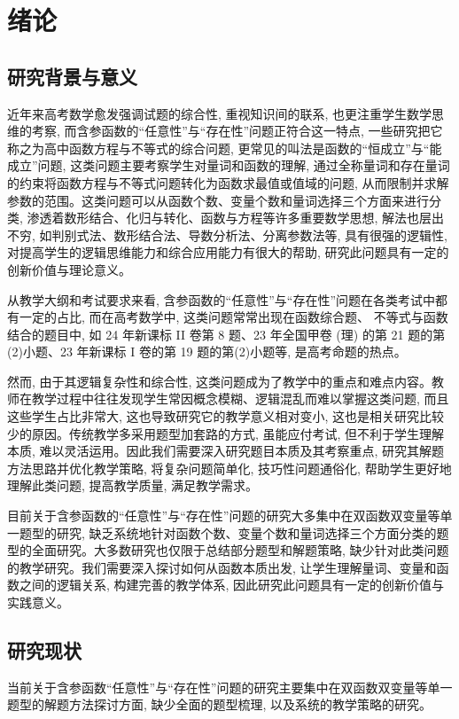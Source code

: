 
\chapter{绪论}
\section{研究背景与意义}
近年来高考数学愈发强调试题的综合性, 重视知识间的联系, 也更注重学生数学思维的考察, 而含参函数的“任意性”与“存在性”问题正符合这一特点, 一些研究把它称之为高中函数方程与不等式的综合问题, 更常见的叫法是函数的“恒成立”与“能成立”问题, 这类问题主要考察学生对量词和函数的理解, 通过全称量词和存在量词的约束将函数方程与不等式问题转化为函数求最值或值域的问题, 从而限制并求解参数的范围。这类问题可以从函数个数、变量个数和量词选择三个方面来进行分类, 渗透着数形结合、化归与转化、函数与方程等许多重要数学思想, 解法也层出不穷, 如判别式法、数形结合法、导数分析法、分离参数法等, 具有很强的逻辑性, 对提高学生的逻辑思维能力和综合应用能力有很大的帮助, 研究此问题具有一定的创新价值与理论意义。

从教学大纲和考试要求来看, 含参函数的“任意性”与“存在性”问题在各类考试中都有一定的占比, 而在高考数学中, 这类问题常常出现在函数综合题、 不等式与函数结合的题目中, 如 24 年新课标 II 卷第 8 题、23 年全国甲卷 (理) 的第 21 题的第(2)小题、23 年新课标 I 卷的第 19 题的第(2)小题等, 是高考命题的热点。

然而, 由于其逻辑复杂性和综合性, 这类问题成为了教学中的重点和难点内容。教师在教学过程中往往发现学生常因概念模糊、逻辑混乱而难以掌握这类问题, 而且这些学生占比非常大, 这也导致研究它的教学意义相对变小, 这也是相关研究比较少的原因。传统教学多采用题型加套路的方式, 虽能应付考试, 但不利于学生理解本质, 难以灵活运用。因此我们需要深入研究题目本质及其考察重点, 研究其解题方法思路并优化教学策略, 将复杂问题简单化, 技巧性问题通俗化, 帮助学生更好地理解此类问题, 提高教学质量, 满足教学需求。

目前关于含参函数的“任意性”与“存在性”问题的研究大多集中在双函数双变量等单一题型的研究, 缺乏系统地针对函数个数、变量个数和量词选择三个方面分类的题型的全面研究。大多数研究也仅限于总结部分题型和解题策略, 缺少针对此类问题的教学研究。我们需要深入探讨如何从函数本质出发, 让学生理解量词、变量和函数之间的逻辑关系, 构建完善的教学体系, 因此研究此问题具有一定的创新价值与实践意义。


\section{研究现状}
当前关于含参函数“任意性”与“存在性”问题的研究主要集中在双函数双变量等单一题型的解题方法探讨方面, 缺少全面的题型梳理, 以及系统的教学策略的研究。

